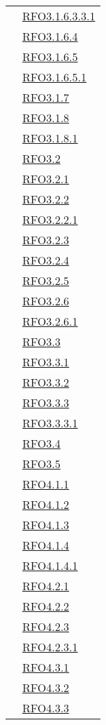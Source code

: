 \begin{longtable}{|>{\centering}m{5cm}|m{5cm}<{\centering}|}
& \hyperlink{RFO3.1.6.3.3.1}{RFO3.1.6.3.3.1}\\
& \hyperlink{RFO3.1.6.4}{RFO3.1.6.4}\\
& \hyperlink{RFO3.1.6.5}{RFO3.1.6.5}\\
& \hyperlink{RFO3.1.6.5.1}{RFO3.1.6.5.1}\\
& \hyperlink{RFO3.1.7}{RFO3.1.7}\\
& \hyperlink{RFO3.1.8}{RFO3.1.8}\\
& \hyperlink{RFO3.1.8.1}{RFO3.1.8.1}\\
& \hyperlink{RFO3.2}{RFO3.2}\\
& \hyperlink{RFO3.2.1}{RFO3.2.1}\\
& \hyperlink{RFO3.2.2}{RFO3.2.2}\\
& \hyperlink{RFO3.2.2.1}{RFO3.2.2.1}\\
& \hyperlink{RFO3.2.3}{RFO3.2.3}\\
& \hyperlink{RFO3.2.4}{RFO3.2.4}\\
& \hyperlink{RFO3.2.5}{RFO3.2.5}\\
& \hyperlink{RFO3.2.6}{RFO3.2.6}\\
& \hyperlink{RFO3.2.6.1}{RFO3.2.6.1}\\
& \hyperlink{RFO3.3}{RFO3.3}\\
& \hyperlink{RFO3.3.1}{RFO3.3.1}\\
& \hyperlink{RFO3.3.2}{RFO3.3.2}\\
& \hyperlink{RFO3.3.3}{RFO3.3.3}\\
& \hyperlink{RFO3.3.3.1}{RFO3.3.3.1}\\
& \hyperlink{RFO3.4}{RFO3.4}\\
& \hyperlink{RFO3.5}{RFO3.5}\\
& \hyperlink{RFO4.1.1}{RFO4.1.1}\\
& \hyperlink{RFO4.1.2}{RFO4.1.2}\\
& \hyperlink{RFO4.1.3}{RFO4.1.3}\\
& \hyperlink{RFO4.1.4}{RFO4.1.4}\\
& \hyperlink{RFO4.1.4.1}{RFO4.1.4.1}\\
& \hyperlink{RFO4.2.1}{RFO4.2.1}\\
& \hyperlink{RFO4.2.2}{RFO4.2.2}\\
& \hyperlink{RFO4.2.3}{RFO4.2.3}\\
& \hyperlink{RFO4.2.3.1}{RFO4.2.3.1}\\
& \hyperlink{RFO4.3.1}{RFO4.3.1}\\
& \hyperlink{RFO4.3.2}{RFO4.3.2}\\
& \hyperlink{RFO4.3.3}{RFO4.3.3}\\

\end{longtable}
